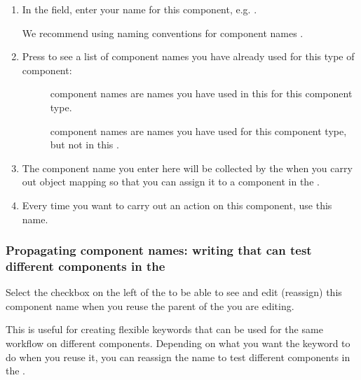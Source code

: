 \begin{enumerate}
\item In the  field, enter your name for this component, e.g. . 

We recommend using naming conventions for component names . 

\item Press  to see a list of component names you have already used for this type of component:

\begin{description}
\item[]{ component names are names you have used in this \gdcase{} for this component type. }
\item []{ component names are names you have used for this component type, but not in this \gdcase{}. }
 \end{description}

\item The component name you enter here will be collected by the \gdomeditor{} when you carry out object mapping so that you can assign it to a component in the \gdaut{}. 

\item Every time you want to carry out an action on this component, use this name. 
\end{enumerate}

\subsubsection{Propagating component names: writing \gdcases{} that can test different components in the \gdaut{}}
\label{TasksCompNamesCheckbox}
Select the checkbox on the left of the \gdcompnamesview{} to be able to see and edit (reassign) this component name when you reuse the parent of the \gdcase{} you are editing. 

This is useful for creating flexible keywords that can be used for the same workflow on different components. Depending on what you want the keyword to do when you reuse it, you can reassign the name to test different components in the \gdaut{}.

